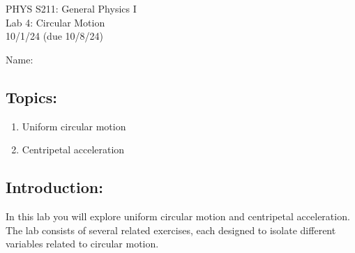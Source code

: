\documentclass[11pt,letterpaper]{article}
\begin{document}
\setlength{\parindent}{0in}


\begin{flushright}
PHYS S211: General Physics I\\
Lab 4: Circular Motion\\
10/1/24 (due 10/8/24)
\end{flushright}

Name:

\subsection*{Topics:}
\begin{enumerate}
\setlength{\parskip}{3pt}
\item Uniform circular motion
\item Centripetal acceleration
\end{enumerate}

\subsection*{Introduction:}
In this lab you will explore uniform circular motion and centripetal acceleration. The lab consists of several related exercises, each designed to isolate different variables related to circular motion. 



\end{document}
